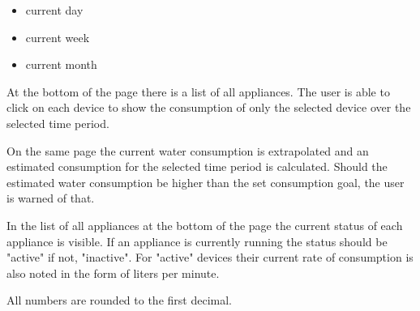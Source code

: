 \documentclass[10pt]{article}
\begin{document}
\begin{itemize}
  \item current day

  \item current week

  \item current month

\end{itemize}

At the bottom of the page there is a list of all appliances. The user is able to click on each device to show the consumption of only the selected device over the selected time period.

On the same page the current water consumption is extrapolated and an estimated consumption for the selected time period is calculated. Should the estimated water consumption be higher than the set consumption goal, the user is warned of that.

In the list of all appliances at the bottom of the page the current status of each appliance is visible. If an appliance is currently running the status should be "active" if not, "inactive". For "active" devices their current rate of consumption is also noted in the form of liters per minute.

All numbers are rounded to the first decimal.
\end{document}
